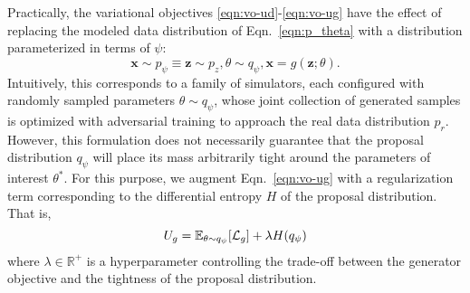 \documentclass[twocolumn,superscriptaddress,aps]{revtex4-1}
\newcommand{\glnote}[1]{\textcolor{red}{[GL: #1]}}
\theoremstyle{plain}
\begin{document}
Practically, the variational objectives \ref{eqn:vo-ud}-\ref{eqn:vo-ug}
have the effect of replacing the modeled data distribution of Eqn.~\ref{eqn:p_theta} with
a distribution parameterized in terms of $\psi$:
\begin{equation}\label{eqn:p_psi}
    \mathbf{x} \sim p_\psi \equiv \mathbf{z} \sim p_z, \theta \sim q_\psi, \mathbf{x} = g(\mathbf{z}; \theta).
\end{equation}
Intuitively, this corresponds to a family of simulators, each configured
with randomly sampled parameters $\theta \sim q_\psi$, whose joint collection
of generated samples is optimized with adversarial training to approach the real data distribution $p_r$.
However, this formulation does not necessarily guarantee that the
proposal distribution $q_\psi$ will place its mass arbitrarily tight
around the parameters of interest $\theta^*$. For this purpose, we augment Eqn.~\ref{eqn:vo-ug}
with a regularization term corresponding to the differential entropy $H$ of
the proposal distribution. That is,
\begin{equation}
    U_g = \mathbb{E}_{\theta \sim q_\psi} [ {\cal L}_g ] + \lambda H(q_\psi)
\end{equation}
where $\lambda \in \mathbb{R}^+$ is a hyperparameter controlling the trade-off
between the generator objective and the tightness of the proposal distribution.



\end{document}
